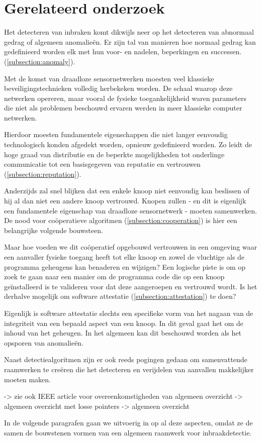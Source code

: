 \section{Gerelateerd onderzoek}
\label{section:related}

Het detecteren van inbraken komt dikwijls neer op het detecteren van abnormaal
gedrag of algemeen anomalie\"en. Er zijn tal van manieren hoe normaal gedrag
kan gedefinieerd worden elk met hun voor- en nadelen, beperkingen en successen.
(\ref{subsection:anomaly}).

Met de komst van draadloze sensornetwerken moesten veel klassieke
beveiligingstechnieken volledig herbekeken worden. De schaal waarop deze
netwerken opereren, maar vooral de fysieke toegankelijkheid waren parameters
die niet als problemen beschouwd ervaren werden in meer klassieke computer
netwerken.

Hierdoor moesten fundamentele eigenschappen die niet langer eenvoudig
technologisch konden afgedekt worden, opnieuw gedefinieerd worden. Zo leidt de
hoge graad van distributie en de beperkte mogelijkheden tot onderlinge
communicatie tot een basisgegeven van reputatie en vertrouwen
(\ref{subsection:reputation}).

Anderzijds zal snel blijken dat een enkele knoop niet eenvoudig kan beslissen
of hij al dan niet een andere knoop vertrouwd. Knopen zullen - en dit is
eigenlijk een fundamentele eigenschap van draadloze sensornetwerk - moeten
samenwerken. De nood voor co\"operatieve algoritmen
(\ref{subsection:cooperation}) is hier een belangrijke volgende bouwsteen.

Maar hoe voeden we dit co\"operatief opgebouwd vertrouwen in een omgeving waar
een aanvaller fysieke toegang heeft tot elke knoop en zowel de vluchtige als de
programma geheugens kan benaderen en wijzigen? Een logische piste is om op zoek
te gaan naar een manier om de programma code die op een knoop ge\"installeerd
is te valideren voor dat deze aangeroepen en vertrouwd wordt. Is het derhalve
mogelijk om software attestatie (\ref{subsection:attestation}) te doen?

Eigenlijk is software attestatie slechts een specifieke vorm van het nagaan van
de integriteit van een bepaald aspect van een knoop. In dit geval gaat het om
de inhoud van het geheugen. In het algemeen kan dit beschouwd worden als het
opsporen van anomalie\"en.

Naast detectiealgoritmen zijn er ook reeds pogingen gedaan om samenvattende
raamwerken te cre\"eren die het detecteren en verijdelen van aanvallen
makkelijker moeten maken.

\TODO -> zie ook IEEE article voor overeenkomstigheden van algemeen overzicht
\TODO \cite{mishra2004intrusion} -> algemeen overzicht met losse pointers
\TODO \cite{alrajeh2013intrusion} -> algemeen overzicht

In de volgende paragrafen gaan we uitvoerig in op al deze aspecten, omdat ze de
samen de bouwstenen vormen van een algemeen raamwerk voor inbraakdetectie.






